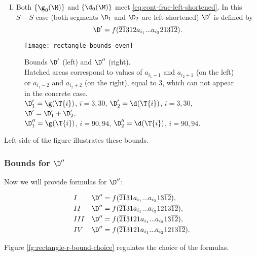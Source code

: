 \begin{enumerate}[I.]
	\item Both $\{\g_0(\M)\}$ and $\{\d_0(\M)\}$
	meet \ref{eq:cont-frac-left-shortened}.
	In this $S-S$ case
	(both segments $\D_1$ and $\D_2$ are left-shortened)
	$\D'$ is defined by
	\begin{equation}\label{eq:bound-l-ss}
		\D' = f(\overline{21}312a_{i_1}... a_{i_2}213\overline{12}).
	\end{equation}
\end{enumerate}

\begin{figure}[p]
	\centering
	\texttt{[image: rectangle-bounds-even]}
	\caption{
		Bounds $\D'$ (left) and $\D''$ (right).\\
		Hatched areas correspond to values of $a_{i_1 - 1}$ and $a_{i_2 + 1}$ (on the left)
		or $a_{i_1 - 2}$ and $a_{i_2 + 2}$ (on the right), equal to 3,
		which can not appear in the concrete case. \\
		$\D_1' = \g(\T{i})$, $i=3,30$,
		$\D_2' = \d  (\T{i})$, $i=3,30$,
		$\D' = \D_1' + \D_2'$. \\
		$\D_1'' = \g(\T{i})$, $i = 90, 94$,
		$\D_2'' = \d  (\T{i})$, $i = 90, 94$.
	}
	\label{fg:rectangle-bounds-even}
\end{figure}

Left side of the figure  illustrates these bounds.

\subsubsection{Bounds for $\D''$}
Now we will provide formulas for $\D''$:

\begin{subequations}
	\begin{align}
		\label{eq:bound-r-nnn}
		&&&&& I & \D'' & = f(\overline{21}31a_{i_1}... a_{i_2}13\overline{12}), &&&& \\
		\label{eq:bound-r-nns-ns}
		&&&&& II & \D'' & = f(\overline{21}31a_{i_1}... a_{i_2}1213\overline{12}), &&&& \\
		\label{eq:bound-r-ns}
		&&&&& III & \D'' & = f(\overline{21}3121a_{i_1}... a_{i_2}13\overline{12}), &&&& \\
		\label{eq:bound-r-sn}
		&&&&& IV & \D'' & = f(\overline{21}3121a_{i_1}... a_{i_2}1213\overline{12}). &&&&
	\end{align}
\end{subequations}

Figure \ref{fg:rectangle-r-bound-choice} regulates the choice of the formulas.

